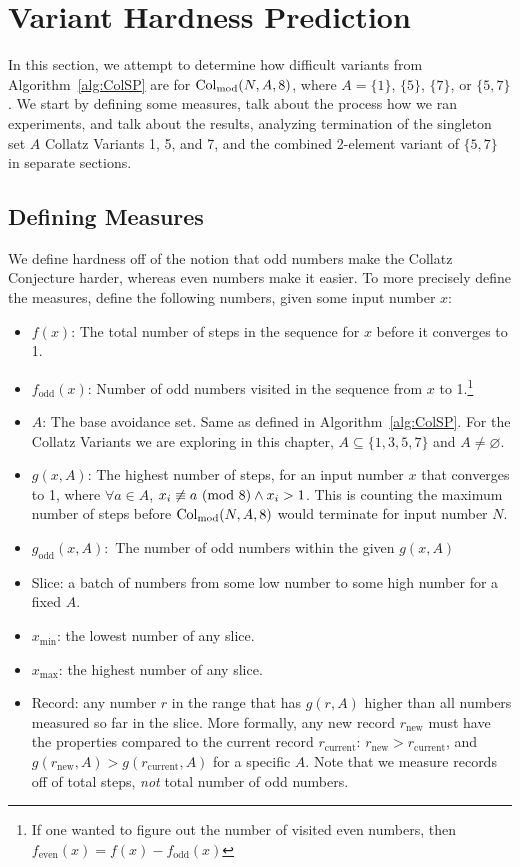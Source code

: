 \chapter{Variant Hardness Prediction} \label{sec:subhrdnspred}
In this section, we attempt to determine how difficult variants from Algorithm~\ref{alg:ColSP} are for $\mathrm{Col}_{\text{mod}}(N,A,8)$, where $A= \{1\}$, $\{5\}$, $\{7\}$, or $\{5,7\}$. We start by defining some measures, talk about the process how we ran experiments, and talk about the results, analyzing termination of the singleton set $A$ Collatz Variants 1, 5, and 7, and the combined 2-element variant of $\{5,7\}$ in separate sections. 
\section{Defining Measures} \label{subsec:algdefinemeasure} 
We define hardness off of the notion that odd numbers make the Collatz Conjecture harder, whereas even numbers make it easier. To more precisely define the measures, define the following numbers, given some input number $x$:
\begin{itemize}
    \item $f(x)$: The total number of steps in the sequence for $x$ before it converges to 1.
    \item $f_\text{odd}(x)$: Number of odd numbers visited in the sequence from $x$ to 1.\footnote{If one wanted to figure out the number of visited even numbers, then $f_\text{even}(x) = f(x) - f_\text{odd}(x)$} 
    \item $A$: The base avoidance set. Same as defined in Algorithm~\ref{alg:ColSP}. For the Collatz Variants we are exploring in this chapter, $A \subseteq \{1, 3, 5, 7\}$ and $A \ne \varnothing$.
    \item $g(x,A)$: The highest number of steps, for an input number $x$ that converges to 1, where $\forall a \in A$, $x_i \not\equiv a \ (\mathrm{mod}\ 8) \wedge x_i > 1$. This is counting the maximum number of steps before $\mathrm{Col}_{\text{mod}}(N,A,8)$ would terminate for input number $N$.
    \item $g_\text{odd}(x,A):$ The number of odd numbers within the given $g(x,A)$
    \item Slice: a batch of numbers from some low number to some high number for a fixed $A$.
    \item $x_{\min}$: the lowest number of any slice.
    \item $x_{\max}$: the highest number of any slice.

    \item Record: any number $r$ in the range that has $g(r,A)$ higher than all numbers measured so far in the slice. More formally, any new record $r_\text{new}$ must have the properties compared to the current record $r_\text{current}$: $r_\text{new} > r_\text{current}$, and $g(r_\text{new},A) > g(r_\text{current},A)$ for a specific $A$. Note that we measure records off of total steps, \textit{not} total number of odd numbers.
      
\end{itemize}

